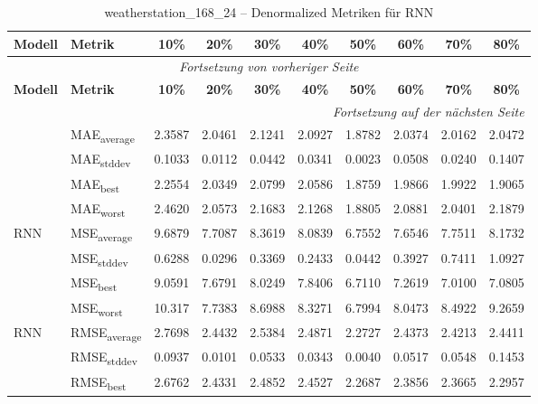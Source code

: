 {\small
\begin{longtable}{l l c c c c c c c c}
    \toprule
    \textbf{Modell} & \textbf{Metrik} & \textbf{10\%} & \textbf{20\%} & \textbf{30\%} & \textbf{40\%} & \textbf{50\%} & \textbf{60\%} & \textbf{70\%} & \textbf{80\%} \\
    \midrule
    \endfirsthead
    \multicolumn{10}{c}{\textit{Fortsetzung von vorheriger Seite}} \\
    \toprule
    \textbf{Modell} & \textbf{Metrik} & \textbf{10\%} & \textbf{20\%} & \textbf{30\%} & \textbf{40\%} & \textbf{50\%} & \textbf{60\%} & \textbf{70\%} & \textbf{80\%} \\
    \midrule
    \endhead
    \midrule
    \multicolumn{10}{r}{\textit{Fortsetzung auf der nächsten Seite}} \\
    \midrule
    \endfoot
    \bottomrule
    \caption{weatherstation_168_24 -- Denormalized Metriken für RNN}
    \label{tab:weatherstation_168_24_denormalized_rnn}
    \endlastfoot
\multirow{4}{*}{RNN} & MAE\textsubscript{average} & 2.3587 & 2.0461 & 2.1241 & 2.0927 & 1.8782 & 2.0374 & 2.0162 & 2.0472 \\
 & MAE\textsubscript{stddev} & 0.1033 & 0.0112 & 0.0442 & 0.0341 & 0.0023 & 0.0508 & 0.0240 & 0.1407 \\
 & MAE\textsubscript{best} & 2.2554 & 2.0349 & 2.0799 & 2.0586 & 1.8759 & 1.9866 & 1.9922 & 1.9065 \\
 & MAE\textsubscript{worst} & 2.4620 & 2.0573 & 2.1683 & 2.1268 & 1.8805 & 2.0881 & 2.0401 & 2.1879 \\
\cmidrule(lr){2-10}
\multirow{4}{*}{RNN} & MSE\textsubscript{average} & 9.6879 & 7.7087 & 8.3619 & 8.0839 & 6.7552 & 7.6546 & 7.7511 & 8.1732 \\
 & MSE\textsubscript{stddev} & 0.6288 & 0.0296 & 0.3369 & 0.2433 & 0.0442 & 0.3927 & 0.7411 & 1.0927 \\
 & MSE\textsubscript{best} & 9.0591 & 7.6791 & 8.0249 & 7.8406 & 6.7110 & 7.2619 & 7.0100 & 7.0805 \\
 & MSE\textsubscript{worst} & 10.317 & 7.7383 & 8.6988 & 8.3271 & 6.7994 & 8.0473 & 8.4922 & 9.2659 \\
\cmidrule(lr){2-10}
\multirow{4}{*}{RNN} & RMSE\textsubscript{average} & 2.7698 & 2.4432 & 2.5384 & 2.4871 & 2.2727 & 2.4373 & 2.4213 & 2.4411 \\
 & RMSE\textsubscript{stddev} & 0.0937 & 0.0101 & 0.0533 & 0.0343 & 0.0040 & 0.0517 & 0.0548 & 0.1453 \\
 & RMSE\textsubscript{best} & 2.6762 & 2.4331 & 2.4852 & 2.4527 & 2.2687 & 2.3856 & 2.3665 & 2.2957 \\

\end{longtable}}
